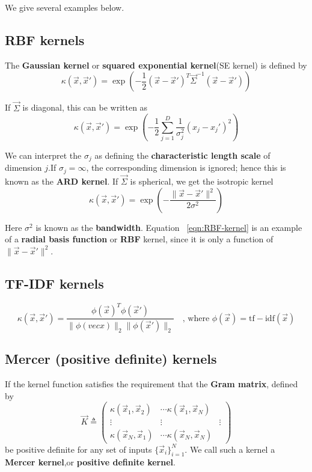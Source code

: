 We give several examples below.

\subsection{RBF kernels}
The \textbf{Gaussian kernel} or \textbf{squared exponential kernel}(SE kernel) is defined by
\begin{equation}
\kappa(\vec{x},\vec{x}')=\exp\left(-\frac{1}{2}(\vec{x}-\vec{x}')^T\vec{\Sigma}^{-1}(\vec{x}-\vec{x}')\right)
\end{equation}

If $\vec{\Sigma}$ is diagonal, this can be written as
\begin{equation}
\kappa(\vec{x},\vec{x}')=\exp\left(-\frac{1}{2}\sum\limits_{j=1}^D \frac{1}{\sigma_j^2}(x_j-x_j')^2\right)
\end{equation}

We can interpret the $\sigma_j$ as defining the \textbf{characteristic length scale} of dimension $j$.If $\sigma_j = \infty$, the corresponding dimension is ignored; hence this is known as the \textbf{ARD kernel}. If $\vec{\Sigma}$ is spherical, we get the isotropic kernel
\begin{equation}\label{eqn:RBF-kernel}
\kappa(\vec{x},\vec{x}')=\exp\left(-\frac{\lVert\vec{x}-\vec{x}'\rVert^2}{2\sigma^2}\right)
\end{equation}

Here $\sigma^2$ is known as the \textbf{bandwidth}. Equation ~\eqref{eqn:RBF-kernel} is an example of a \textbf{radial basis function} or \textbf{RBF} kernel, since it is only a function of $\lVert\vec{x}-\vec{x}'\rVert^2$.


\subsection{TF-IDF kernels}
\begin{equation}\label{eqn:RBF-kernel}
\kappa(\vec{x},\vec{x}')=\frac{\phi(\vec{x})^T\phi(\vec{x}')}{\lVert\phi(vec{x})\rVert_2\lVert\phi(\vec{x}')\rVert_2} \quad \text{, where } \phi(\vec{x})=\mathrm{tf-idf}(\vec{x})
\end{equation}


\subsection{Mercer (positive definite) kernels}
\label{sec:Mercer-kernels}
If the kernel function satisfies the requirement that the \textbf{Gram matrix}, defined by
\begin{equation}
\vec{K} \triangleq \left(\begin{array}{ccc}
\kappa(\vec{x}_1,\vec{x}_2) & \cdots \kappa(\vec{x}_1,\vec{x}_N) \\
\vdots & \vdots & \vdots \\
\kappa(\vec{x}_N,\vec{x}_1) & \cdots \kappa(\vec{x}_N,\vec{x}_N) 
\end{array}\right)
\end{equation}
be positive definite for any set of inputs $\{\vec{x}_i\}_{i=1}^N$. We call such a kernel a \textbf{Mercer kernel},or \textbf{positive definite kernel}.

